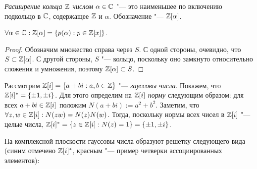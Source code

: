 \begin{definition}
	\textit{Расширение кольца $\mathbb{Z}$ числом $\alpha \in \mathbb{C}$} "--- это наименьшее по включению подкольцо в $\mathbb{C}$, содержащее $\mathbb{Z}$ и $\alpha$. Обозначение "--- $\mathbb{Z}[\alpha]$.
\end{definition}

\begin{proposition}
	$\forall \alpha \in \mathbb{C}: \mathbb{Z}[\alpha] = \{p(\alpha): p \in \mathbb{Z}[x]\}$.
\end{proposition}

\begin{proof}
	Обозначим множество справа через $S$. С одной стороны, очевидно, что $S \subset \mathbb{Z}[\alpha]$. С другой стороны, $S$ "--- кольцо, поскольку оно замкнуто относительно сложения и умножения, поэтому $\mathbb{Z}[\alpha] \subset S$.
\end{proof}

\begin{example}
	Рассмотрим $\mathbb{Z}[i] = \{a + bi: a, b \in \mathbb{Z}\}$ "--- \textit{гауссовы числа}. Покажем, что $\Z[i]^* \hm= \{\pm1, \pm i\}$. Для этого определим на $\mathbb{Z}[i]$ \textit{норму} следующим образом: для всех $a + bi \in \mathbb{Z}[i]$ положим $N(a + bi) := a^2 + b^2$. Заметим, что $\forall z, w \in \mathbb{Z}[i]: N(zw) = N(z)N(w)$. Тогда, поскольку нормы всех чисел в $\mathbb{Z}[i]$ "--- целые числа, $\mathbb{Z}[i]^* = \{z \in \mathbb{Z}[i]: N(z) = 1\} = \{\pm1, \pm i\}$.
	
	\pagebreak
	На комплексной плоскости гауссовы числа образуют решетку следующего вида (синим отмечено $\mathbb{Z}[i]^*$, красным "--- пример четверки ассоциированных элементов):
	\begin{center}
	\end{center}
\end{example}

